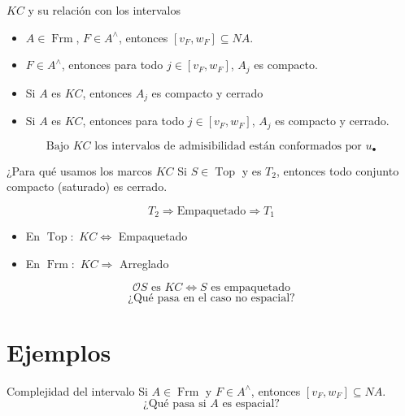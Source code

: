 \documentclass[compress,12pt]{beamer}
\DeclareMathOperator{\Frm}{Frm}
\DeclareMathOperator{\Top}{Top}
\begin{document}
\begin{frame}{$KC$ y su relación con los intervalos}
\begin{itemize}
    \item $A\in \Frm$, $F\in A^\wedge$, entonces $[v_F, w_F]\subseteq NA$.
    \item $F\in A^\wedge$, entonces para todo $j\in [v_F, w_F]$, $A_j$ es compacto. 
    \item<2-> Si $A$ es $KC$, entonces $A_j$ es compacto y cerrado
    \item<3-> Si $A$ es $KC$, entonces para todo $j\in [v_F, w_F]$, $A_j$ es compacto y cerrado.
\end{itemize}
\[
\mbox{Bajo }KC\mbox{ los intervalos de admisibilidad están conformados por }u_\bullet
\]
\end{frame}

\begin{frame}{¿Para qué usamos los marcos $KC$}
Si $S\in \Top$ y es $T_2$, entonces todo conjunto compacto (saturado) es cerrado.

\[
T_2\Rightarrow \mbox{Empaquetado}\Rightarrow T_1
\]

\begin{itemize}
    \item<3-> En $\Top:$ $KC\Leftrightarrow$ Empaquetado
    \item<4-> En $\Frm:$ $KC\Rightarrow$ Arreglado
\end{itemize}

\[
\mathcal{O}S\mbox{ es }KC\Leftrightarrow S \mbox{ es empaquetado}
\]
\[
\mbox{¿Qué pasa en el caso no espacial?}
\]
\end{frame}

\section{Ejemplos}
\begin{frame}{Complejidad del intervalo}
Si $A\in \Frm$ y $F\in A^\wedge$, entonces $[v_F, w_F]\subseteq NA$.
\[
\mbox{¿Qué pasa si } A \mbox{ es espacial}?
\]
\end{frame}
\end{document}
